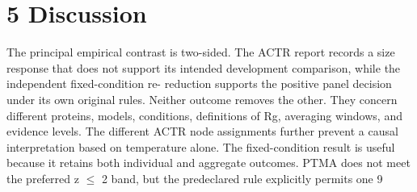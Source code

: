 \documentclass[11pt]{article}
\begin{document}
\section*{5 Discussion}

The principal empirical contrast is two-sided. The ACTR report records a size response that
does not support its intended development comparison, while the independent fixed-condition re-
reduction supports the positive panel decision under its own original rules. Neither outcome removes
the other. They concern different proteins, models, conditions, definitions of Rg, averaging windows,
and evidence levels. The different ACTR node assignments further prevent a causal interpretation
based on temperature alone.
The fixed-condition result is useful because it retains both individual and aggregate outcomes.
PTMA does not meet the preferred z \ensuremath{\leq} 2 band, but the predeclared rule explicitly permits one
9
\end{document}
